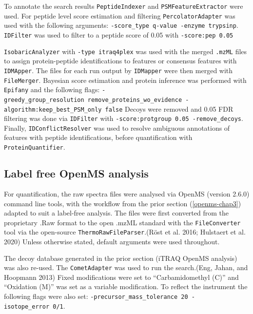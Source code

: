 \documentclass[
]{article}
\begin{document}
To annotate the search results \texttt{PeptideIndexer} and \texttt{PSMFeatureExtractor} were used.
For peptide level score estimation and filtering \texttt{PercolatorAdapter} was used with the following arguments: \texttt{-score\_type\ q-value\ -enzyme\ trypsinp}.
\texttt{IDFilter} was used to filter to a peptide score of 0.05 with \texttt{-score:pep\ 0.05}

\texttt{IsobaricAnalyzer} with \texttt{-type\ itraq4plex} was used with the merged \texttt{.mzML} files to assign protein-peptide identifications to features or consensus features with \texttt{IDMApper}.
The files for each run output by \texttt{IDMapper} were then merged with \texttt{FileMerger}.
Bayesian score estimation and protein inference was performed with \texttt{Epifany} and the following flags: \texttt{-greedy\_group\_resolution\ remove\_proteins\_wo\_evidence\ -algorithm:keep\_best\_PSM\_only\ false} Decoys were removed and 0.05 FDR filtering was done via \texttt{IDFilter} with \texttt{-score:protgroup\ 0.05\ -remove\_decoys}.
Finally, \texttt{IDConflictResolver} was used to resolve ambiguous annotations of features with peptide identifications, before quantification with \texttt{ProteinQuantifier}.

\hypertarget{openms-label-free}{%
\subsection{Label free OpenMS analysis}\label{openms-label-free}}

For quantification, the raw spectra files were analysed via OpenMS (version 2.6.0) command line tools, with the workflow from the prior section (\ref{openms-chap3}) adapted to suit a label-free analysis.
The files were first converted from the proprietary .Raw format to the open .mzML standard with the \texttt{FileConverter} tool via the open-source \texttt{ThermoRawFileParser}.(Röst et al. 2016; Hulstaert et al. 2020) Unless otherwise stated, default arguments were used throughout.

The decoy database generated in the prior section (iTRAQ OpenMS analysis) was also re-used.
The \texttt{CometAdapter} was used to run the search.(Eng, Jahan, and Hoopmann 2013) Fixed modifications were set to ``Carbamidomethyl (C)'' and ``Oxidation (M)'' was set as a variable modification.
To reflect the instrument the following flags were also set: \texttt{-precursor\_mass\_tolerance\ 20\ -isotope\_error\ 0/1}.
\end{document}
